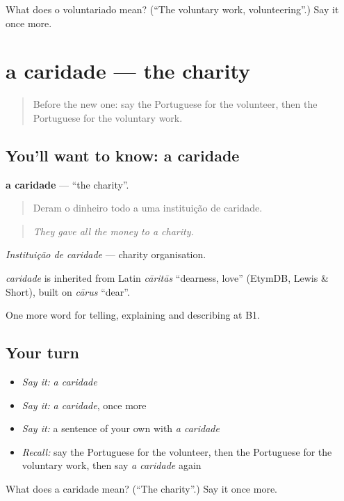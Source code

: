 \begin{tcolorbox}[breakable,colback=teal!4,colframe=teal!35!black,title={Before you move on}]
What does o voluntariado mean? (\textquotedblleft{}The voluntary work, volunteering\textquotedblright{}.) Say it once more.
\end{tcolorbox}
\section[a caridade]{a caridade — the charity}

\label{lesson:PT-C367-caridade}



\begin{quote}
Before the new one: say the Portuguese for the volunteer, then the Portuguese for the voluntary work.
\end{quote}

\subsection*{You'll want to know: a caridade}
\textbf{a caridade} — \textquotedblleft{}the charity\textquotedblright{}.

\begin{quote}
Deram o dinheiro todo a uma instituição de caridade.
\end{quote}

\begin{quote}
\emph{They gave all the money to a charity.}
\end{quote}

\emph{Instituição de caridade} — charity organisation.

\begin{cousinweb}
\emph{caridade} is inherited from Latin \emph{cāritās} \textquotedblleft{}dearness, love\textquotedblright{} (EtymDB, Lewis \& Short), built on \emph{cārus} \textquotedblleft{}dear\textquotedblright{}.
\end{cousinweb}

\begin{grammarlens}[title={What you've built}]
One more word for telling, explaining and describing at B1.
\end{grammarlens}

\subsection*{Your turn}
\begin{itemize}
\raggedright
  \item \emph{Say it:} \emph{a caridade}
  \item \emph{Say it:} \emph{a caridade}, once more
  \item \emph{Say it:} a sentence of your own with \emph{a caridade}
  \item \emph{Recall:} say the Portuguese for the volunteer, then the Portuguese for the voluntary work, then say \emph{a caridade} again
\end{itemize}

\begin{tcolorbox}[breakable,colback=teal!4,colframe=teal!35!black,title={Before you move on}]
What does a caridade mean? (\textquotedblleft{}The charity\textquotedblright{}.) Say it once more.
\end{tcolorbox}
